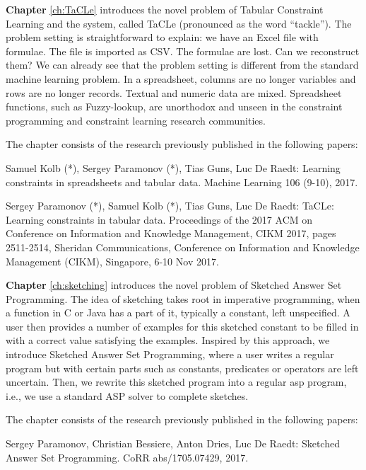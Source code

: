 \textbf{Chapter} \ref{ch:TaCLe} introduces  the novel problem of
Tabular Constraint Learning and the system, called TaCLe (pronounced
as the word ``tackle''). The problem setting is straightforward to
explain: we have an Excel file with formulae. The file is imported as
CSV. The formulae are lost. Can we reconstruct them? We can already 
see that the problem setting is different from the standard machine
learning problem. In a spreadsheet, columns are no longer variables
and rows are no longer records. Textual and numeric data are mixed.
Spreadsheet functions, such as Fuzzy-lookup, are unorthodox and unseen in
the constraint programming and constraint learning research communities.

The chapter consists of the research previously published in the following papers:

\begin{addmargin}[2em]{2em}
Samuel Kolb (*), Sergey Paramonov (*), Tias Guns, Luc De Raedt:
  Learning constraints in spreadsheets and tabular data. Machine
  Learning 106 (9-10), 2017.


Sergey Paramonov (*), Samuel Kolb (*), Tias Guns, Luc De Raedt:
TaCLe: Learning constraints in tabular data. 
 Proceedings of the 2017 ACM on Conference on Information and
    Knowledge Management, CIKM 2017, pages 2511-2514, Sheridan
    Communications, Conference on Information and Knowledge Management
    (CIKM), Singapore, 6-10 Nov 2017.
\end{addmargin}


\textbf{Chapter} \ref{ch:sketching} introduces the novel problem of
Sketched Answer Set Programming. The idea of sketching takes root in
imperative programming, when a function in C or Java has a part of it,
typically a constant, left unspecified. A user then provides a number
of examples for this sketched constant to be filled in with a
correct value satisfying the examples. Inspired by this approach, we
introduce Sketched Answer Set Programming, where a user writes a
regular program but with certain parts such as constants, predicates
or operators are left uncertain. Then, we rewrite this sketched
program into a regular \acrlong{asp} program, i.e., we use a standard ASP solver
to complete sketches.


The chapter consists of the research previously published in the following papers:
\begin{addmargin}[2em]{2em}
  Sergey Paramonov, Christian Bessiere, Anton Dries, Luc De Raedt:
  Sketched Answer Set Programming. CoRR abs/1705.07429, 2017.
\end{addmargin}


